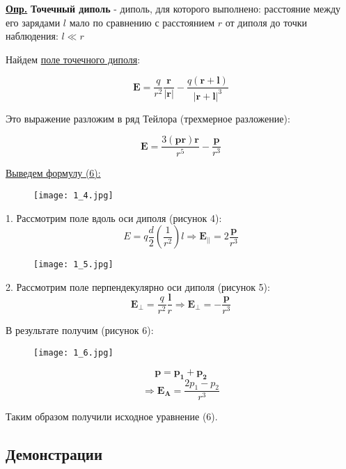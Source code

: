 \colorbox{faded}{\underline{\textbf{Опр.}}} \textbf{Точечный диполь} - диполь, для которого выполнено: расстояние между его зарядами $l$ мало по сравнению с расстоянием $r$ от диполя до точки наблюдения: $l \ll r$

Найдем \underline{поле точечного диполя}:

$$\mathbf{E} = \frac{q}{r^2} \frac{\mathbf{r}}{|\mathbf{r}|} - \frac{q(\mathbf{r} + \mathbf{l})}{|\mathbf{r} + \mathbf{l}|^3}$$

Это выражение разложим в ряд Тейлора (трехмерное разложение):

\begin{equation}\label{opr6}
\mathbf{E} = \frac{3(\mathbf{p} \mathbf{r}) \mathbf{r}}{r^5} - \frac{\mathbf{p}}{r^3}
\end{equation}

\underline{Выведем формулу (6):}

\begin{figure}[!ht]
\centering
 \texttt{[image: 1\_4.jpg]}     
 \label{fig:my_label}
 \caption{}
\end{figure}

1. Рассмотрим поле вдоль оси диполя (рисунок 4):
$$E = q \frac{d}{2} (\frac{1}{r^2}) l \Rightarrow \mathbf{E_{||}} = 2 \frac{\mathbf{p}}{r^3}$$

\begin{figure}[!ht]
\centering
 \texttt{[image: 1\_5.jpg]}     
 \label{fig:my_label}
 \caption{}
\end{figure}

2. Рассмотрим поле перпендекулярно оси диполя (рисунок 5):
$$\mathbf{E_{\perp}} =  \frac{q}{r^2} \frac{\mathbf{l}}{r}  \Rightarrow \mathbf{E_{\perp}} = - \frac{\mathbf{p}}{r^3}$$

В результате получим (рисунок 6):

\begin{figure}[!ht]
\centering
 \texttt{[image: 1\_6.jpg]}     
 \label{fig:my_label}
 \caption{}
\end{figure}

$$ \mathbf{p}  = \mathbf{p_{1}} + \mathbf{p_{2}}$$
$$\Rightarrow \mathbf{E_{A}} = \frac{2p_{1} - p_{2}}{r^3}$$

Таким образом получили исходное уравнение (6).

\subsection{Демонстрации}

